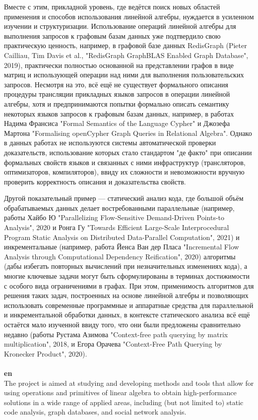 \documentclass[12pt]{article}  %
\theoremstyle{remark}
\begin{document}
Вместе с этим, прикладной уровень, где ведётся поиск новых областей применения и способов использования линейной алгебры, нуждается в усиленном изучении и структуризации. Использование операций линейной алгебры для выполнения запросов к графовым базам данных уже подтвердило свою практическую ценность, например, в графовой базе данных RedisGraph (Pieter Cailliau, Tim Davis et al., "RedisGraph GraphBLAS Enabled Graph Database", 2019), практически полностью основанной на представлении графов в виде матриц и использующей операции над ними для выполнения пользовательских запросов. Несмотря на это, всё ещё не существует формального описания процедуры трансляции прикладных языков запросов в операции линейной алгебры, хотя и предпринимаются попытки формально описать семантику некоторых языков запросов к графовым базам данных, например, в работах Надима Франсиса "Formal Semantics of the Language Cypher" и Джозефа Мартона "Formalising openCypher Graph Queries in Relational Algebra". Однако в данных работах не используются системы автоматической проверки доказательств, использование которых стало стандартом "де факто" при описании формальных свойств языков и связанных с ними инфраструктур (трансляторов, оптимизаторов, компиляторов), ввиду их сложности и невозможности вручную проверить корректность описания и доказательства свойств.

Другой показательный пример --- статический анализ кода, где большой объём обрабатываемых данных делает востребованными параллельные (например, работы Хайбо Ю "Parallelizing Flow-Sensitive Demand-Driven Points-to Analysis", 2020 и Ронга Гу "Towards Efficient Large-Scale Interprocedural Program Static Analysis on Distributed Data-Parallel Computation", 2021) и инкрементальные (например, работа Йенса Ван дер Пласа "Incremental Flow Analysis through Computational Dependency Reification", 2020) алгоритмы (дабы избегать повторных вычислений при незначительных изменениях кода), а многие ключевые задачи могут быть сформулированы в терминах достижимости с особого вида ограничениями в графах. При этом, применимость алгоритмов для решения таких задач, построенных на основе линейной алгебры и позволяющих использовать современные программные и аппаратные средства для параллельной и инкрементальной обработки данных, в контексте статического анализа всё ещё остаётся мало изученной ввиду того, что они были предложены сравнительно недавно (работы Рустама Азимова "Context-free path querying by matrix multiplication", 2018, и Егора Орачева "Context-Free Path Querying by Kronecker Product", 2020).
\\
\\
\textbf{en}\\
The project is aimed at studying and developing methods and tools that allow for using operations and primitives of linear algebra to obtain high-performance solutions in a wide range of applied areas, including (but not limited to) static code analysis, graph databases, and social network analysis.
\end{document}
